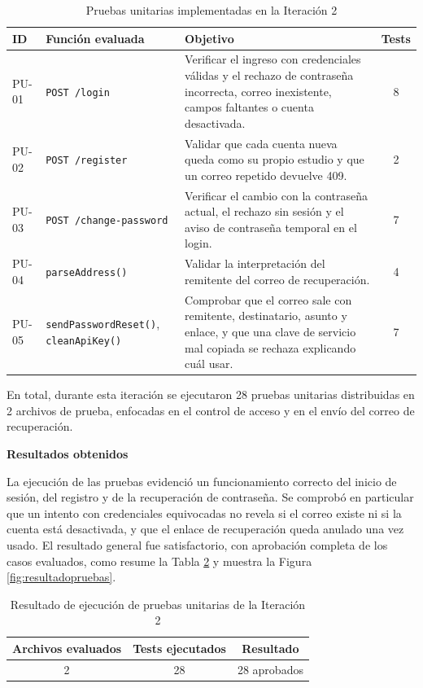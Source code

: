 \documentclass[12pt,letterpaper,oneside]{report}
\newcommand{\titulopar}[1]{\par\textbf{#1}\par}
\begin{document}
\begin{table}[H]
  \centering
  \caption{Pruebas unitarias implementadas en la Iteración 2}
  \label{tab:pruebas2}
  \renewcommand{\arraystretch}{1.2}
  \begin{tabular}{|l|p{3.4cm}|p{6.6cm}|c|}
    \hline
    \textbf{ID} & \textbf{Función evaluada} & \textbf{Objetivo} & \textbf{Tests} \\
    \hline
    PU-01 & \texttt{POST /login} & Verificar el ingreso con credenciales válidas y el rechazo de contraseña incorrecta, correo inexistente, campos faltantes o cuenta desactivada. & 8 \\ \hline
    PU-02 & \texttt{POST /register} & Validar que cada cuenta nueva queda como su propio estudio y que un correo repetido devuelve 409. & 2 \\ \hline
    PU-03 & \texttt{POST /change-\newline password} & Verificar el cambio con la contraseña actual, el rechazo sin sesión y el aviso de contraseña temporal en el login. & 7 \\ \hline
    PU-04 & \texttt{parseAddress()} & Validar la interpretación del remitente del correo de recuperación. & 4 \\ \hline
    PU-05 & \texttt{sendPassword\newline Reset()}, \texttt{clean\newline ApiKey()} & Comprobar que el correo sale con remitente, destinatario, asunto y enlace, y que una clave de servicio mal copiada se rechaza explicando cuál usar. & 7 \\ \hline
  \end{tabular}
\end{table}

En total, durante esta iteración se ejecutaron 28 pruebas unitarias distribuidas en 2 archivos de prueba, enfocadas en el control de acceso y en el envío del correo de recuperación.

\titulopar{Resultados obtenidos}
La ejecución de las pruebas evidenció un funcionamiento correcto del inicio de sesión, del registro y de la recuperación de contraseña. Se comprobó en particular que un intento con credenciales equivocadas no revela si el correo existe ni si la cuenta está desactivada, y que el enlace de recuperación queda anulado una vez usado. El resultado general fue satisfactorio, con aprobación completa de los casos evaluados, como resume la Tabla \ref{tab:resultado2} y muestra la Figura \ref{fig:resultadopruebas}.

\begin{table}[H]
  \centering
  \caption{Resultado de ejecución de pruebas unitarias de la Iteración 2}
  \label{tab:resultado2}
  \renewcommand{\arraystretch}{1.2}
  \begin{tabular}{|c|c|c|}
    \hline
    \textbf{Archivos evaluados} & \textbf{Tests ejecutados} & \textbf{Resultado} \\
    \hline
    2 & 28 & 28 aprobados \\ \hline
  \end{tabular}
\end{table}
\end{document}
